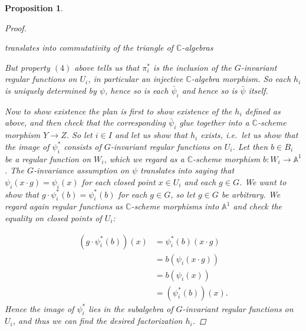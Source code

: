 \documentclass[12pt,a4paper]{amsart}
\theoremstyle{plain}
\newtheorem{prop}[thm]{Proposition}
\theoremstyle{definition}
\theoremstyle{remark}
\begin{document}
\begin{prop}
\begin{proof}
    \begin{center}
    \end{center}
    translates into commutativity of the triangle of $\mathbb{C}$-algebras

    \begin{center}
    \end{center}

    But property $(4)$ above tells us that $\pi_{i}^{*}$ is the inclusion of the $G$-invariant regular functions on $U_{i}$, in particular an injective $\mathbb{C}$-algebra morphism.
    So each $h_{i}$ is uniquely determined by $\psi$, hence so is each $\bar{\psi}_{i}$ and hence so is $\bar{\psi}$ itself.

    Now to show existence the plan is first to show existence of the $h_{i}$ defined as above, and then check that the corresponding $\bar{\psi}_{i}$ glue together into a $\mathbb{C}$-scheme morphism $Y \to Z$.
    So let $i \in I$ and let us show that $h_{i}$ exists, i.e.~let us show that the image of $\psi_{i}^{*}$ consists of $G$-invariant regular functions on $U_{i}$.
    Let then $b \in B_{i}$ be a regular function on $W_{i}$, which we regard as a $\mathbb{C}$-scheme morphism $b \colon W_{i} \to \mathbb{A}^{1}$.
    The $G$-invariance assumption on $\psi$ translates into saying that $\psi_{i}(x \cdot g) = \psi_{i}(x)$ for each closed point $x \in U_{i}$ and each $g \in G$.
    We want to show that $g \cdot \psi_{i}^{*}(b) = \psi_{i}^{*}(b)$ for each $g \in G$, so let $g \in G$ be arbitrary.
    We regard again regular functions as $\mathbb{C}$-scheme morphisms into $\mathbb{A}^{1}$ and check the equality on closed points of $U_{i}$:

    \begin{align*}
      (g \cdot \psi_{i}^{*}(b))(x) & = \psi_{i}^{*}(b)(x \cdot g) \\
      & = b(\psi_{i}(x \cdot g)) \\
      & = b(\psi_{i}(x)) \\
      & = (\psi_{i}^{*}(b))(x).
    \end{align*}
    Hence the image of $\psi_{i}^{*}$ lies in the subalgebra of $G$-invariant regular functions on $U_{i}$, and thus we can find the desired factorization $h_{i}$.


\end{proof}
\end{prop}
\end{document}
